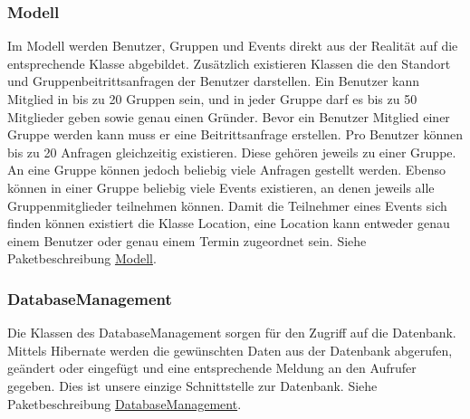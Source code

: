 	\subsubsection{Modell}
Im Modell werden Benutzer, Gruppen und Events direkt aus der Realität auf die entsprechende Klasse abgebildet. Zusätzlich existieren Klassen die den Standort und Gruppenbeitrittsanfragen der Benutzer darstellen.
Ein Benutzer kann Mitglied in bis zu 20 Gruppen sein, und in jeder Gruppe darf es bis zu 50 Mitglieder geben sowie genau einen Gründer. Bevor ein Benutzer Mitglied einer Gruppe werden kann muss er eine Beitrittsanfrage erstellen.
Pro Benutzer können bis zu 20 Anfragen gleichzeitig existieren. Diese gehören jeweils zu einer Gruppe.
An eine Gruppe können jedoch beliebig viele Anfragen gestellt werden.
Ebenso können in einer Gruppe beliebig viele Events existieren, an denen jeweils alle Gruppenmitglieder teilnehmen können.
Damit die Teilnehmer eines Events sich finden können existiert die Klasse Location, eine Location kann entweder genau einem Benutzer oder genau einem Termin zugeordnet sein. 
\newline
Siehe Paketbeschreibung \hyperlink{database.model}{Modell}.
\begin {center}
\end {center}



	\subsubsection{DatabaseManagement}
	Die Klassen des DatabaseManagement sorgen für den Zugriff auf die Datenbank.
	Mittels Hibernate werden die gewünschten Daten aus der Datenbank abgerufen, geändert oder eingefügt und eine entsprechende Meldung an den Aufrufer gegeben.
	Dies ist unsere einzige Schnittstelle zur Datenbank.	
	\newline
Siehe Paketbeschreibung \hyperlink{database.management}{DatabaseManagement}.

